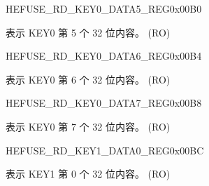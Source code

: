 \begin{register}{H}{EFUSE\_RD\_KEY0\_DATA5\_REG}{0x00B0}\label{regdesc:EFUSERDKEY0DATA5REG}
%
\regnewline%
\begin{regdesc}\begin{reglist}
\label{fielddesc:EFUSEKEY0DATA5}\item [EFUSE\_KEY0\_DATA5] 表示 KEY0 第 5 个 32 位内容。 (RO)
\end{reglist}\end{regdesc}
\end{register}


\begin{register}{H}{EFUSE\_RD\_KEY0\_DATA6\_REG}{0x00B4}\label{regdesc:EFUSERDKEY0DATA6REG}
%
\regnewline%
\begin{regdesc}\begin{reglist}
\label{fielddesc:EFUSEKEY0DATA6}\item [EFUSE\_KEY0\_DATA6] 表示 KEY0 第 6 个 32 位内容。 (RO)
\end{reglist}\end{regdesc}
\end{register}


\begin{register}{H}{EFUSE\_RD\_KEY0\_DATA7\_REG}{0x00B8}\label{regdesc:EFUSERDKEY0DATA7REG}
%
\regnewline%
\begin{regdesc}\begin{reglist}
\label{fielddesc:EFUSEKEY0DATA7}\item [EFUSE\_KEY0\_DATA7] 表示 KEY0 第 7 个 32 位内容。 (RO)
\end{reglist}\end{regdesc}
\end{register}


\begin{register}{H}{EFUSE\_RD\_KEY1\_DATA0\_REG}{0x00BC}\label{regdesc:EFUSERDKEY1DATA0REG}
%
\regnewline%
\begin{regdesc}\begin{reglist}
\label{fielddesc:EFUSEKEY1DATA0}\item [EFUSE\_KEY1\_DATA0] 表示 KEY1 第 0 个 32 位内容。 (RO)
\end{reglist}\end{regdesc}
\end{register}


